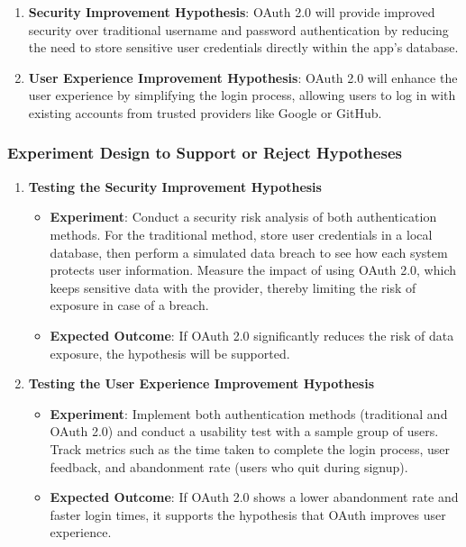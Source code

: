 \begin{enumerate}
    \item \textbf{Security Improvement Hypothesis}: OAuth 2.0 will provide improved security over traditional username and password authentication by reducing the need to store sensitive user credentials directly within the app's database.

    \item \textbf{User Experience Improvement Hypothesis}: OAuth 2.0 will enhance the user experience by simplifying the login process, allowing users to log in with existing accounts from trusted providers like Google or GitHub.
\end{enumerate}

\subsubsection*{Experiment Design to Support or Reject Hypotheses}

\begin{enumerate}
    \item \textbf{Testing the Security Improvement Hypothesis}

    \begin{itemize}
        \item \textbf{Experiment}: Conduct a security risk analysis of both authentication methods. For the traditional method, store user credentials in a local database, then perform a simulated data breach to see how each system protects user information. Measure the impact of using OAuth 2.0, which keeps sensitive data with the provider, thereby limiting the risk of exposure in case of a breach.
        \item \textbf{Expected Outcome}: If OAuth 2.0 significantly reduces the risk of data exposure, the hypothesis will be supported.
    \end{itemize}

    \item \textbf{Testing the User Experience Improvement Hypothesis}

    \begin{itemize}
        \item \textbf{Experiment}: Implement both authentication methods (traditional and OAuth 2.0) and conduct a usability test with a sample group of users. Track metrics such as the time taken to complete the login process, user feedback, and abandonment rate (users who quit during signup).
        \item \textbf{Expected Outcome}: If OAuth 2.0 shows a lower abandonment rate and faster login times, it supports the hypothesis that OAuth improves user experience.
    \end{itemize}
\end{enumerate}


